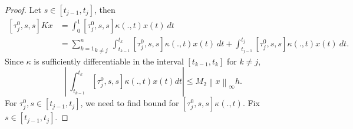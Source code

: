 \documentclass[sn-mathphys-num]{sn-jnl}%
\theoremstyle{thmstyleone}%
\theoremstyle{thmstyletwo}%
\theoremstyle{thmstylethree}%
\newcommand{\norm}[1]{\left\lVert #1\right\rVert}
\begin{document}
\begin{proof}
	Let $s \in [t_{j-1},t_j]$, then
	\begin{align}\label{Eq: 12}
		[\tau_j^0,s,s]Kx&=\int_0^1 [\tau_j^0,s,s] \kappa(.,t) x(t) ~dt \nonumber \\
		&= \underset{k \ne j}{\sum_{k=1}^{n}}~\int_{t_{k-1}}^{t_k} [\tau_j^0,s,s] \kappa(.,t) x(t) ~dt + \int_{t_{j-1}}^{t_j} [\tau_j^0,s,s] \kappa(.,t) x(t) ~dt.
	\end{align}
	Since $\kappa$ is sufficiently differentiable in the interval $[t_{k-1},t_k]$ for $k \ne j$,
	\begin{equation}\label{Eq: 13}
		\left |~ \int_{t_{k-1}}^{t_k} [\tau_j^0,s,s] \kappa(.,t) x(t) dt \right | \le M_2 \norm{x}_\infty h.
	\end{equation} 
	For $\tau_j^0, s \in [t_{j-1},t_j]$, we need to find bound for $[\tau_j^0,s,s] \kappa(.,t)$.
	Fix $s \in [t_{j-1},{t_j}].$
	

\end{proof}
\end{document}
